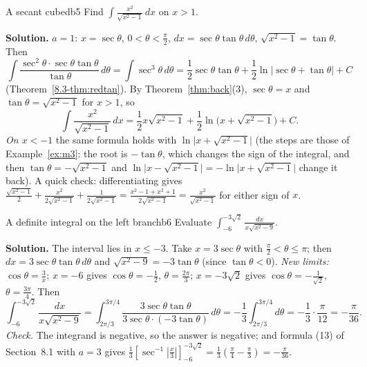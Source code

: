 \documentclass[11pt]{article}
\begin{document}
\begin{exmp}{A secant cubed}{b5}
Find $\int\frac{x^2}{\sqrt{x^2-1}}\,dx$ on $x>1$.

\textbf{Solution.} $a=1$: $x=\sec\theta$, $0<\theta<\frac\pi2$, $dx=\sec\theta\tan\theta\,d\theta$, $\sqrt{x^2-1}=\tan\theta$. Then
\[\int\frac{\sec^2\theta\cdot\sec\theta\tan\theta}{\tan\theta}\,d\theta=\int\sec^3\theta\,d\theta=\frac12\sec\theta\tan\theta+\frac12\ln\lvert\sec\theta+\tan\theta\rvert+C\]
(Theorem~\ref{8.3-thm:redtan}). By Theorem~\ref{thm:back}(3), $\sec\theta=x$ and $\tan\theta=\sqrt{x^2-1}$ for $x>1$, so
\[\int\frac{x^2}{\sqrt{x^2-1}}\,dx=\frac12x\sqrt{x^2-1}+\frac12\ln\big(x+\sqrt{x^2-1}\big)+C .\]
\emph{On $x<-1$} the same formula holds with $\ln\lvert x+\sqrt{x^2-1}\rvert$ (the steps are those of Example~\ref{ex:m3}: the root is $-\tan\theta$, which changes the sign of the integral, and then $\tan\theta=-\sqrt{x^2-1}$ and $\ln\lvert x-\sqrt{x^2-1}\rvert=-\ln\lvert x+\sqrt{x^2-1}\rvert$ change it back). A quick check: differentiating gives $\frac{\sqrt{x^2-1}}2+\frac{x^2}{2\sqrt{x^2-1}}+\frac1{2\sqrt{x^2-1}}=\frac{x^2-1+x^2+1}{2\sqrt{x^2-1}}=\frac{x^2}{\sqrt{x^2-1}}$ for either sign of $x$.
\end{exmp}

\begin{exmp}{A definite integral on the left branch}{b6}
Evaluate $\int_{-6}^{-3\sqrt2}\frac{dx}{x\sqrt{x^2-9}}$.

\textbf{Solution.} The interval lies in $x\le-3$. Take $x=3\sec\theta$ with $\frac\pi2<\theta\le\pi$; then $dx=3\sec\theta\tan\theta\,d\theta$ and $\sqrt{x^2-9}=-3\tan\theta$ (since $\tan\theta<0$). \emph{New limits:} $\cos\theta=\frac3x$; $x=-6$ gives $\cos\theta=-\frac12$, $\theta=\frac{2\pi}3$; $x=-3\sqrt2$ gives $\cos\theta=-\frac1{\sqrt2}$, $\theta=\frac{3\pi}4$. Then
\[\int_{-6}^{-3\sqrt2}\frac{dx}{x\sqrt{x^2-9}}=\int_{2\pi/3}^{3\pi/4}\frac{3\sec\theta\tan\theta}{3\sec\theta\cdot(-3\tan\theta)}\,d\theta=-\frac13\int_{2\pi/3}^{3\pi/4}d\theta=-\frac13\cdot\frac\pi{12}=-\frac\pi{36} .\]
\emph{Check.} The integrand is negative, so the answer is negative; and formula (13) of Section~8.1 with $a=3$ gives $\frac13\left[\sec^{-1}\left\lvert\frac x3\right\rvert\right]_{-6}^{-3\sqrt2}=\frac13\left(\frac\pi4-\frac\pi3\right)=-\frac\pi{36}$.
\end{exmp}
\end{document}
